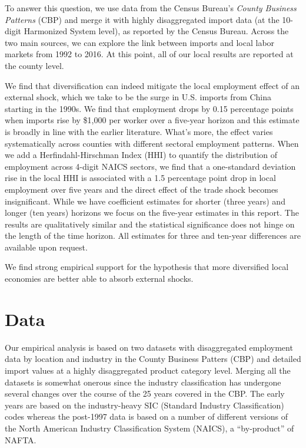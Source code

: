 \documentclass[onehalfspacing,11pt]{article}
\begin{document}
To answer this question, we use data from the Census Bureau's  {\it County Business Patterns} (CBP) and merge it with highly disaggregated import data (at the 10-digit Harmonized System level), as reported by the Census Bureau. Across the two main sources, we can explore the link between imports and local labor markets from 1992 to 2016. At this point, all of our local results are reported at the county level.

We find that diversification can indeed mitigate the local employment effect of an external shock, which we take to be the surge in U.S. imports from China starting in the 1990s. We find that employment drops by 0.15 percentage points when imports rise by \$1,000 per worker over a five-year horizon and this estimate is broadly in line with the earlier literature. What's more, the effect varies systematically across counties with different sectoral employment patterns. When we add a Herfindahl-Hirschman Index (HHI) to quantify the distribution of employment across 4-digit NAICS sectors, we find that a one-standard deviation rise in the local HHI is associated with a 1.5 percentage point drop in local employment over five years and the direct effect of the trade shock becomes insignificant. While we have coefficient estimates for shorter (three years) and longer (ten years) horizons we focus on the five-year estimates in this report. The results are qualitatively similar and the statistical significance does not hinge on the length of the time horizon. All estimates for three and ten-year differences are available upon request.

We find strong empirical support for the hypothesis that more diversified local economies are better able to absorb external shocks.

\section{Data}
Our empirical analysis is based on two datasets with disaggregated employment data by location and industry in the County Business Patters (CBP) and detailed import values at a highly disaggregated product category level. Merging all the datasets is somewhat onerous since the industry classification has undergone several changes over the course of the 25 years covered in the CBP. The early years are based on the industry-heavy SIC (Standard Industry Classification) codes whereas the post-1997 data is based on a number of different versions of the North American Industry Classification System (NAICS), a ``by-product'' of NAFTA.
\end{document}
